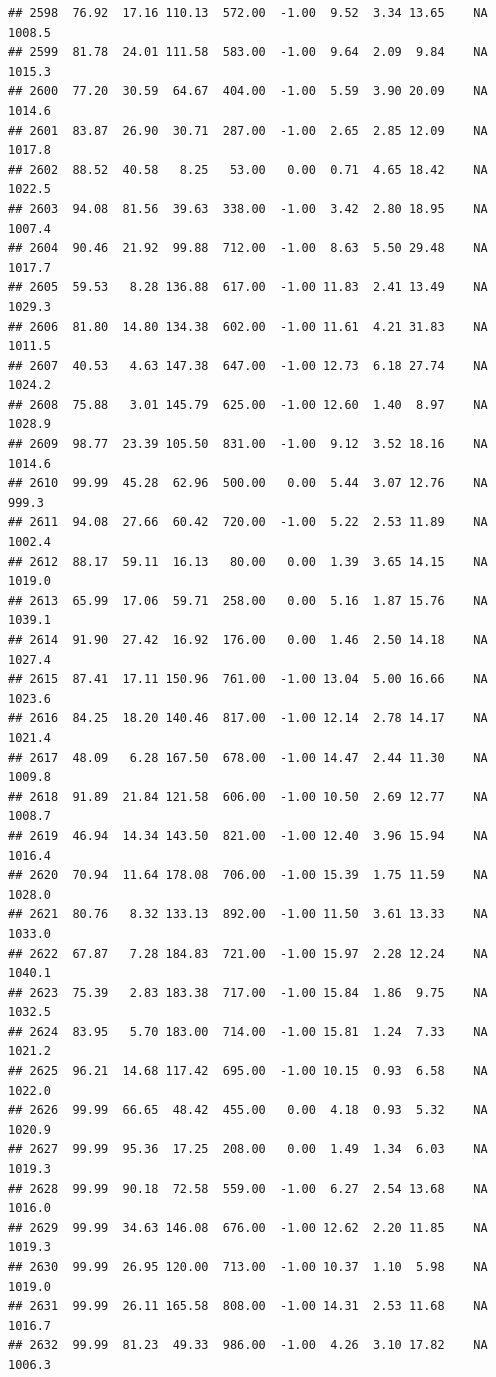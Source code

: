 \documentclass{article}\usepackage{graphicx, color}
\makeatletter
\newenvironment{kframe}{%
 \def\at@end@of@kframe{}%
 \ifinner\ifhmode%
  \def\at@end@of@kframe{\end{minipage}}%
  \begin{minipage}{\columnwidth}%
 \fi\fi%
 \def\FrameCommand##1{\hskip\@totalleftmargin \hskip-\fboxsep
 \colorbox{shadecolor}{##1}\hskip-\fboxsep
     \hskip-\linewidth \hskip-\@totalleftmargin \hskip\columnwidth}%
 \MakeFramed {\advance\hsize-\width
   \@totalleftmargin\z@ \linewidth\hsize
   \@setminipage}}%
 {\par\unskip\endMakeFramed%
 \at@end@of@kframe}
\newenvironment{knitrout}{}{} %
\makeatother
\begin{document}
\begin{knitrout}
\begin{kframe}
\begin{verbatim}
## 2598  76.92  17.16 110.13  572.00  -1.00  9.52  3.34 13.65    NA 1008.5
## 2599  81.78  24.01 111.58  583.00  -1.00  9.64  2.09  9.84    NA 1015.3
## 2600  77.20  30.59  64.67  404.00  -1.00  5.59  3.90 20.09    NA 1014.6
## 2601  83.87  26.90  30.71  287.00  -1.00  2.65  2.85 12.09    NA 1017.8
## 2602  88.52  40.58   8.25   53.00   0.00  0.71  4.65 18.42    NA 1022.5
## 2603  94.08  81.56  39.63  338.00  -1.00  3.42  2.80 18.95    NA 1007.4
## 2604  90.46  21.92  99.88  712.00  -1.00  8.63  5.50 29.48    NA 1017.7
## 2605  59.53   8.28 136.88  617.00  -1.00 11.83  2.41 13.49    NA 1029.3
## 2606  81.80  14.80 134.38  602.00  -1.00 11.61  4.21 31.83    NA 1011.5
## 2607  40.53   4.63 147.38  647.00  -1.00 12.73  6.18 27.74    NA 1024.2
## 2608  75.88   3.01 145.79  625.00  -1.00 12.60  1.40  8.97    NA 1028.9
## 2609  98.77  23.39 105.50  831.00  -1.00  9.12  3.52 18.16    NA 1014.6
## 2610  99.99  45.28  62.96  500.00   0.00  5.44  3.07 12.76    NA  999.3
## 2611  94.08  27.66  60.42  720.00  -1.00  5.22  2.53 11.89    NA 1002.4
## 2612  88.17  59.11  16.13   80.00   0.00  1.39  3.65 14.15    NA 1019.0
## 2613  65.99  17.06  59.71  258.00   0.00  5.16  1.87 15.76    NA 1039.1
## 2614  91.90  27.42  16.92  176.00   0.00  1.46  2.50 14.18    NA 1027.4
## 2615  87.41  17.11 150.96  761.00  -1.00 13.04  5.00 16.66    NA 1023.6
## 2616  84.25  18.20 140.46  817.00  -1.00 12.14  2.78 14.17    NA 1021.4
## 2617  48.09   6.28 167.50  678.00  -1.00 14.47  2.44 11.30    NA 1009.8
## 2618  91.89  21.84 121.58  606.00  -1.00 10.50  2.69 12.77    NA 1008.7
## 2619  46.94  14.34 143.50  821.00  -1.00 12.40  3.96 15.94    NA 1016.4
## 2620  70.94  11.64 178.08  706.00  -1.00 15.39  1.75 11.59    NA 1028.0
## 2621  80.76   8.32 133.13  892.00  -1.00 11.50  3.61 13.33    NA 1033.0
## 2622  67.87   7.28 184.83  721.00  -1.00 15.97  2.28 12.24    NA 1040.1
## 2623  75.39   2.83 183.38  717.00  -1.00 15.84  1.86  9.75    NA 1032.5
## 2624  83.95   5.70 183.00  714.00  -1.00 15.81  1.24  7.33    NA 1021.2
## 2625  96.21  14.68 117.42  695.00  -1.00 10.15  0.93  6.58    NA 1022.0
## 2626  99.99  66.65  48.42  455.00   0.00  4.18  0.93  5.32    NA 1020.9
## 2627  99.99  95.36  17.25  208.00   0.00  1.49  1.34  6.03    NA 1019.3
## 2628  99.99  90.18  72.58  559.00  -1.00  6.27  2.54 13.68    NA 1016.0
## 2629  99.99  34.63 146.08  676.00  -1.00 12.62  2.20 11.85    NA 1019.3
## 2630  99.99  26.95 120.00  713.00  -1.00 10.37  1.10  5.98    NA 1019.0
## 2631  99.99  26.11 165.58  808.00  -1.00 14.31  2.53 11.68    NA 1016.7
## 2632  99.99  81.23  49.33  986.00  -1.00  4.26  3.10 17.82    NA 1006.3

\end{verbatim}
\end{kframe}
\end{knitrout}
\end{document}
